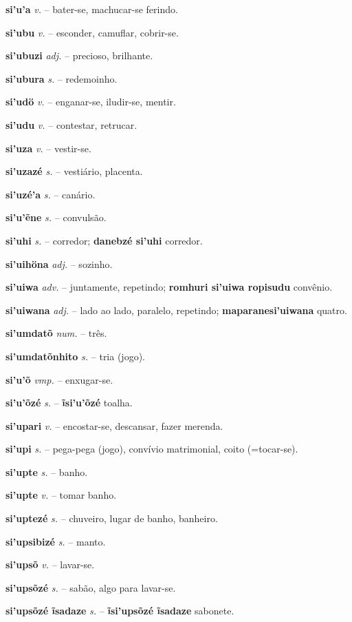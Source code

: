 \textbf{si'u'a} \textit{v.} -- bater-se, machucar-se ferindo.

\textbf{si'ubu} \textit{v.} -- esconder, camuflar, cobrir-se.

\textbf{si'ubuzi} \textit{adj.} -- precioso, brilhante.

\textbf{si'ubura} \textit{s.} -- redemoinho.

\textbf{si'udö} \textit{v.} -- enganar-se, iludir-se, mentir.

\textbf{si'udu} \textit{v.} -- contestar, retrucar.

\textbf{si'uza} \textit{v.} -- vestir-se.

\textbf{si'uzazé} \textit{s.} -- vestiário, placenta.

\textbf{si'uzé'a} \textit{s.} -- canário.

\textbf{si'u'ẽne} \textit{s.} -- convulsão.

\textbf{si'uhi} \textit{s.} -- corredor; \textbf{danebzé si'uhi} corredor.

\textbf{si'uihöna} \textit{adj.} -- sozinho.

\textbf{si'uiwa} \textit{adv.} -- juntamente, repetindo; \textbf{romhuri si'uiwa ropisudu} convênio.

\textbf{si'uiwana} \textit{adj.} -- lado ao lado, paralelo, repetindo; \textbf{maparanesi'uiwana} quatro.

\textbf{si'umdatõ} \textit{num.} -- três.

\textbf{si'umdatõnhito} \textit{s.} -- tria (jogo).

\textbf{si'u'õ} \textit{vmp.} -- enxugar-se.

\textbf{si'u'õzé} \textit{s.} -- \textbf{ĩsi'u'õzé} toalha.

\textbf{si'upari} \textit{v.} -- encostar-se, descansar, fazer merenda.

\textbf{si'upi} \textit{s.} -- pega-pega (jogo), convívio matrimonial, coito (=tocar-se).

\textbf{si'upte} \textit{s.} -- banho.

\textbf{si'upte} \textit{v.} -- tomar banho.

\textbf{si'uptezé} \textit{s.} -- chuveiro, lugar de banho, banheiro.

\textbf{si'upsibizé} \textit{s.} -- manto.

\textbf{si'upsõ} \textit{v.} -- lavar-se.

\textbf{si'upsõzé} \textit{s.} -- sabão, algo para lavar-se.

\textbf{si'upsõzé ĩsadaze} \textit{s.} -- \textbf{ĩsi'upsõzé ĩsadaze} sabonete.

